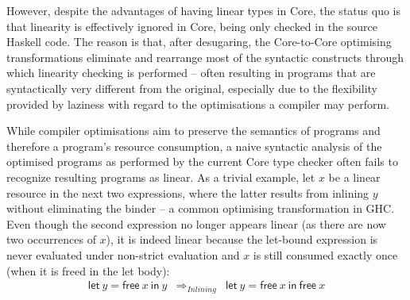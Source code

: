 \documentclass[acmsmall,review,screen]{acmart}
\newcommand{\llet}[2]{\mathsf{let}~#1~\mathsf{in}~#2}
\newcommand{\ROUNDTWO}[1]{{\color{red}#1}}
\begin{document}
%
\ROUNDTWO{However, despite the advantages of having linear types in Core, the status quo is}
that linearity is effectively ignored in Core, being only checked
in the source Haskell code. The reason is that, \ROUNDTWO{after} desugaring, the
Core-to-Core optimising transformations eliminate and rearrange most of the
syntactic constructs through which linearity checking is performed -- often
resulting in programs that are syntactically very different from the original,
especially due to the flexibility provided by laziness with regard to the
optimisations a compiler may perform.

While compiler optimisations aim to preserve the semantics of
programs and therefore a program's resource consumption,
a naive syntactic analysis of the optimised programs as
performed by the current Core type checker often fails to recognize
\ROUNDTWO{resulting} programs as linear.
%
As a trivial example, let $x$ be a linear resource in the next two expressions,
where the latter results from inlining $y$ without eliminating the
binder -- a common optimising transformation in GHC. Even
though the second expression no longer appears linear (as there are now two occurrences
of $x$), it is indeed linear because the let-bound expression is never
evaluated under \ROUNDTWO{non-strict} evaluation and $x$ is still consumed exactly once (when it is freed in the let body):
%
\[
\begin{array}{ccc}
\llet{y = \textsf{free}~x}{y} & \Longrightarrow_{Inlining} & \llet{y = \textsf{free}~x}{\textsf{free}~x}
\end{array}
\]

\end{document}
